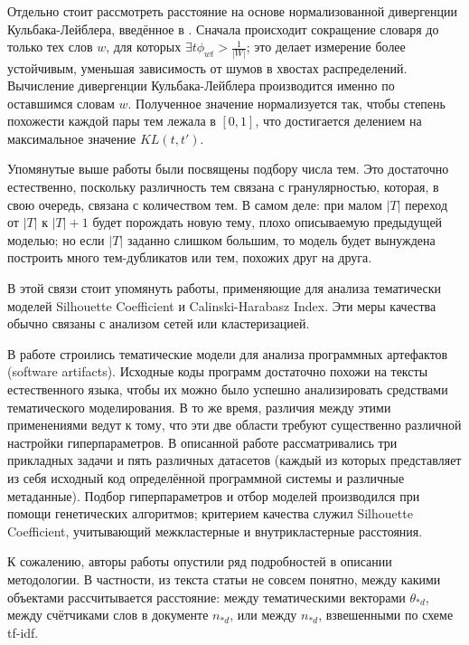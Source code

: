 Отдельно стоит рассмотреть расстояние на основе нормализованной дивергенции Кульбака-Лейблера, введённое в \cite{koltcov2014latent}. Сначала происходит сокращение словаря до только тех слов $w$, для которых $\exists t \phi_{wt} > \frac{1}{|W|}$; это делает измерение более устойчивым, уменьшая зависимость от шумов в хвостах распределений. Вычисление дивергенции Кульбака-Лейблера производится именно по оставшимся словам $w$. Полученное значение нормализуется так, чтобы степень похожести каждой пары тем лежала в $[0, 1]$, что достигается делением на максимальное значение $KL(t, t')$. 

Упомянутые выше работы были посвящены подбору числа тем. Это достаточно естественно, поскольку различность тем связана с гранулярностью, которая, в свою очередь, связана с количеством тем. В самом деле: при малом $|T|$ переход от $|T|$ к $|T|+1$ будет порождать новую тему, плохо описываемую предыдущей моделью; но если $|T|$ заданно слишком большим, то модель будет вынуждена построить много тем-дубликатов или тем, похожих друг на друга.

В этой связи стоит упомянуть работы, применяющие для анализа тематически моделей Silhouette Coefficient и Calinski-Harabasz Index. Эти меры качества обычно связаны с анализом сетей или кластеризацией.

В работе \cite{panichella2013effectively} строились тематические модели для анализа программных артефактов (software artifacts). Исходные коды программ достаточно похожи на тексты естественного языка, чтобы их можно было успешно анализировать средствами тематического моделирования. В то же время, различия между этими применениями ведут к тому, что эти две области требуют существенно различной настройки гиперпараметров. В описанной работе рассматривались три прикладных задачи и пять различных датасетов (каждый из которых представляет из себя исходный код определённой программной системы и различные метаданные). Подбор гиперпараметров и отбор моделей производился при помощи генетических алгоритмов; критерием качества служил Silhouette Coefficient, учитывающий межкластерные и внутрикластерные расстояния.

К сожалению, авторы работы \cite{panichella2013effectively} опустили ряд подробностей в описании методологии. В частности, из текста статьи не совсем понятно, между какими объектами рассчитывается расстояние: между тематическими векторами $\theta_{\ast d}$, между счётчиками слов в документе $n_{\ast d}$, или между $n_{\ast d}$, взвешенными по схеме tf-idf.

